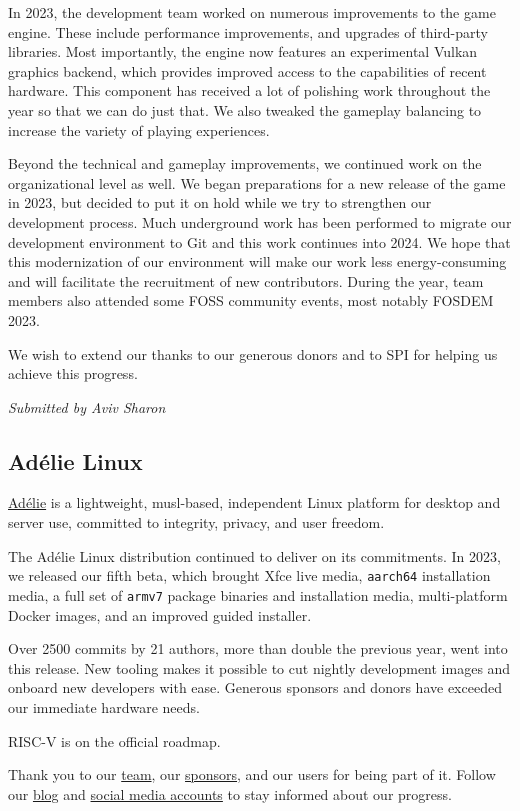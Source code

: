 \documentclass[a4paper]{report}
\begin{document}
In 2023, the development team worked on numerous improvements to the game engine. These include performance improvements, and upgrades of third-party libraries. Most importantly, the engine now features an experimental Vulkan graphics backend, which provides improved access to the capabilities of recent hardware. This component has received a lot of polishing work throughout the year so that we can do just that. We also tweaked the gameplay balancing to increase the variety of playing experiences.

Beyond the technical and gameplay improvements, we continued work on the organizational level as well. We began preparations for a new release of the game in 2023, but decided to put it on hold while we try to strengthen our development process. Much underground work has been performed to migrate our development environment to Git and this work continues into 2024. We hope that this modernization of our environment will make our work less energy-consuming and will facilitate the recruitment of new contributors. During the year, team members also attended some FOSS community events, most notably FOSDEM 2023.

We wish to extend our thanks to our generous donors and to SPI for helping us achieve this progress.

{\em Submitted by Aviv Sharon}

\subsection{Adélie Linux}

\href{https://www.adelielinux.org/}{Adélie} is a lightweight, musl-based, independent Linux platform for desktop and server use, committed to integrity, privacy, and user freedom.

The Adélie Linux distribution continued to deliver on its commitments. In 2023, we released our fifth beta, which brought Xfce live media, {\tt aarch64} installation media, a full set of {\tt armv7} package binaries and installation media, multi-platform Docker images, and an improved guided installer.

Over 2500 commits by 21 authors, more than double the previous year, went into this release. New tooling makes it possible to cut nightly development images and onboard new developers with ease. Generous sponsors and donors have exceeded our immediate hardware needs.

RISC-V is on the official roadmap.

Thank you to our \href{https://git.adelielinux.org/groups/adelie/-/group_members}{team}, our \href{https://www.adelielinux.org/sponsors/}{sponsors}, and our users for being part of it. Follow our \href{https://blog.adelielinux.org/}{blog} and \href{https://www.adelielinux.org/contact/}{social media accounts} to stay informed about our progress.
\end{document}
